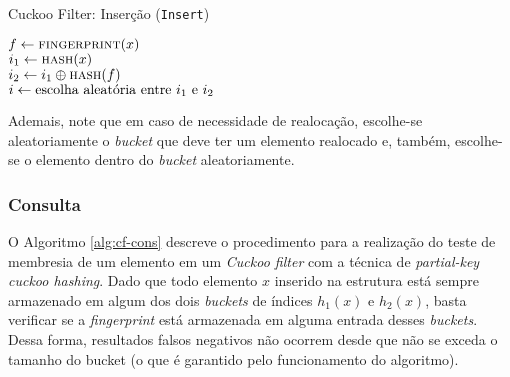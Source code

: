 \documentclass[12pt,twoside,english,brazilian]{article}
\begin{document}
\begin{algorithm}
    \caption{Cuckoo Filter: Inserção (\texttt{Insert})}\label{alg:cf-ins}

    $f \leftarrow \Call{fingerprint}{x}$ \\
    $i_1 \leftarrow \Call{hash}{x}$ \\
    $i_2 \leftarrow i_1 \oplus \Call{hash}{f}$ \\
    $i \leftarrow \textup{escolha aleatória entre } i_1 \textup{ e } i_2$ \\
     
\end{algorithm}

Ademais, note que em caso de necessidade de realocação, escolhe-se aleatoriamente o \textit{bucket} que deve ter um elemento realocado e, também, escolhe-se o elemento dentro do \textit{bucket} aleatoriamente.

\subsubsection{Consulta}

O Algoritmo \ref{alg:cf-cons} descreve o procedimento para a realização do teste de membresia de um elemento em um \textit{Cuckoo filter} com a técnica de \textit{partial-key cuckoo hashing}. Dado que todo elemento $x$ inserido na estrutura está sempre armazenado em algum dos dois \textit{buckets} de índices $h_1(x)$ e $h_2(x)$, basta verificar se a \textit{fingerprint} está armazenada em alguma entrada desses \textit{buckets}. Dessa forma, resultados falsos negativos não ocorrem desde que não se exceda o tamanho do bucket (o que é garantido pelo funcionamento do algoritmo).
\end{document}
